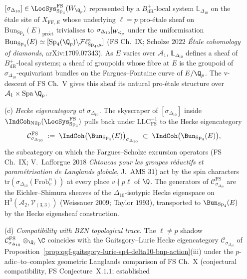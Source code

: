 \begin{conjecture}
\begin{enumerate}
 $[\sigma_{\Delta_{10}}]\in\LocSys_{\mathrm{Sp}_4}^{\mathrm{FS}}(W_{\Q_p})$
 represented by a $B_{\mathrm{dR}}^+$-local system $\mathbb L_{\Delta_{10}}$
 on the \'etale site of $X_{\mathrm{FF},E}$ whose underlying
 $\ell=p$ pro-\'etale sheaf on $\mathrm{Bun}_{\mathrm{Sp}_4}(E)_{\mathrm{pro\acute{e}t}}$
 trivialises to $\sigma_{\Delta_{10}}|_{W_{\Q_p}}$ under the
 uniformisation
 $\mathrm{Bun}_{\mathrm{Sp}_4}(E)\simeq[\mathrm{Sp}_4(\Q_p)\backslash \mathcal{F}\ell_{\mathrm{Sp}_4,\mu}^{\diamond}]$
 (FS Ch.~IX; Scholze $2022$ \emph{\'Etale cohomology of diamonds},
 arXiv:$1709.07343$). As $E$ varies over $\mathcal A_1$,
 $\mathbb L_{\Delta_{10}}$ defines a sheaf of $B_{\mathrm{dR}}^+$-local
 systems; a sheaf of groupoids whose fibre at $E$ is the groupoid of
 $\sigma_{\Delta_{10}}$-equivariant bundles on the Fargues--Fontaine
 curve of $E/\Q_p$. The v-descent of FS Ch.~V gives this sheaf its
 natural pro-\'etale structure over $\mathcal A_1 \times\mathrm{Spa}\,\Q_p$.
 \item[\textup{(c)}] \emph{Hecke eigencategory at $\sigma_{\Delta_{10}}$.}
 The skyscraper of $[\sigma_{\Delta_{10}}]$ inside
 $\IndCoh_{\mathrm{Nilp}}(\LocSys_{\mathrm{Sp}_4}^{\mathrm{FS}})$
 pulls back under $\mathrm{LLC}_{\mathrm{FS}}^{-1}$ to the Hecke
 eigencategory
 \[
 \mathcal C_{\sigma_{\Delta_{10}}}^{\mathrm{FS}}
 \;:=\;\IndCoh\bigl(\Bun_{\mathrm{Sp}_4}(E)\bigr)_{\sigma_{\Delta_{10}}}
 \;\subset\;\IndCoh\bigl(\Bun_{\mathrm{Sp}_4}(E)\bigr),
 \]
 the subcategory on which the Fargues--Scholze excursion operators
 (FS Ch.~IX; V.~Lafforgue $2018$ \emph{Chtoucas pour les groupes r\'eductifs
 et param\'etrisation de Langlands globale}, J.\ AMS $31$) act by the
 spin characters $\mathrm{tr}(\sigma_{\Delta_{10}}(\mathrm{Frob}_v^n))$
 at every place $v\nmid p\ell$ of $\Q$. The generators of
 $\mathcal C_{\sigma_{\Delta_{10}}}^{\mathrm{FS}}$ are the Eichler--Shimura
 sheaves of the $\Delta_{10}$-isotypic Hecke eigenspace on
 $\mathrm{H}^3(\mathcal A_2,\mathcal V_{(3,3)})$ (Weissauer $2009$; Taylor
 $1993$), transported to $\Bun_{\mathrm{Sp}_4}(E)$ by the Hecke
 eigensheaf construction.
 \item[\textup{(d)}] \emph{Compatibility with BZN topological trace.}
 The $\ell\neq p$ shadow
 $\mathcal C_{\sigma_{\Delta_{10}}}^{\mathrm{FS}}\otimes_{\Q_\ell}\C$
 coincides with the Gaitsgory--Lurie Hecke eigencategory
 $\mathcal C_{\sigma_{\Delta_{10}}}$ of
 Proposition~\ref{prop:qgf-gaitsgory-lurie-sp4-delta10-bnp-action}(iii)
 under the $p$-adic--to--complex geometric Langlands comparison of
 FS Ch.~X (conjectural compatibility, FS Conjecture~X.$1.1$; established

\end{enumerate}
\end{conjecture}

